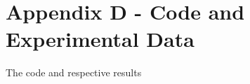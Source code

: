 \cleardoublepage%
\chapter*{\label{chap:apx_d}Appendix D - Code and Experimental Data}%
%

The code and respective results